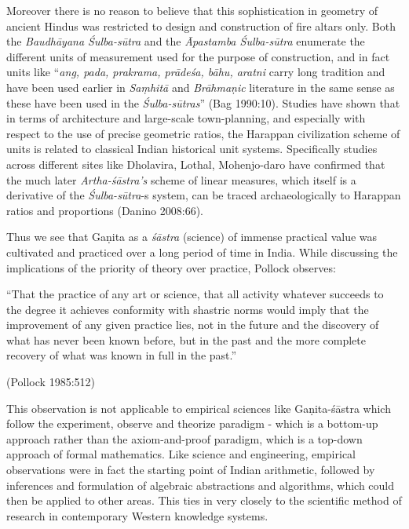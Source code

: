 Moreover there is no reason to believe that this sophistication in geometry of ancient Hindus was restricted to design and construction of fire altars only. Both the {\sl Baudhāyana Śulba-sūtra} and the {\sl Āpastamba Śulba-sūtra} enumerate the different units of measurement used for the purpose of construction, and in fact units like ``{\sl ang, pada, prakrama, prādeśa, bāhu, aratni} carry long tradition and have been used earlier in {\sl Saṃhitā} and {\sl Brāhmaṇic} literature in the same sense as these have been used in the {\sl Śulba-sūtras}'' (Bag 1990:10). Studies have shown that in terms of architecture and large-scale town-planning, and especially with respect to the use of precise geometric ratios, the Harappan civilization scheme of units is related to classical Indian historical unit systems. Specifically studies across different sites like Dholavira, Lothal, Mohenjo-daro have confirmed that the much later {\sl Artha-śāstra’s} scheme of linear measures, which itself is a derivative of the {\sl Śulba-sūtra}-s system, can be traced archaeologically to Harappan ratios and proportions (Danino 2008:66).

Thus we see that Gaṇita as a {\sl śāstra} (science) of immense practical value was cultivated and practiced over a long period of time in India. While discussing the implications of the priority of theory over practice, Pollock observes: 
\begin{myquote}
``That the practice of any art or science, that all activity whatever succeeds to the degree it achieves conformity with shastric norms would imply that the improvement of any given practice lies, not in the future and the discovery of what has never been known before, but in the past and the more complete recovery of what was known in full in the past.''

\hfill (Pollock 1985:512)
\end{myquote}

This observation is not applicable to empirical sciences like Gaṇita-śāstra which follow the experiment, observe and theorize paradigm - which is a bottom-up approach rather than the axiom-and-proof paradigm, which is a top-down approach of formal mathematics. Like science and engineering, empirical observations were in fact the starting point of Indian arithmetic, followed by inferences and formulation of algebraic abstractions and algorithms, which could then be applied to other areas. This ties in very closely to the scientific method of research in contemporary Western knowledge systems.

